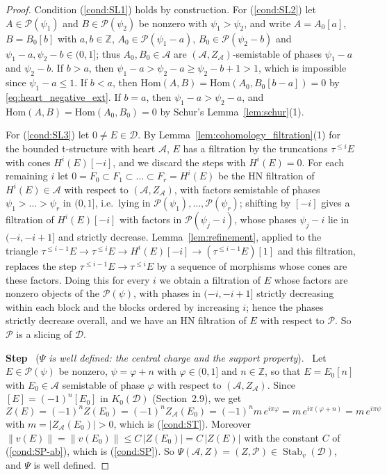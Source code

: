 \documentclass[12pt]{amsart}
\newcommand{\condref}[1]{\textup{(\ref{#1})}}
\numberwithin{theorem}{section}
\theoremstyle{definition}
\newcounter{pstep}
\newcommand{\step}[1]{\par\medskip\noindent\refstepcounter{pstep}\textbf{Step \thepstep}\ (\textit{#1}).\ \ignorespaces}
\newcommand{\ZZ}{\mathbb{Z}}
\newcommand{\calA}{\mathcal{A}}
\newcommand{\calP}{\mathcal{P}}
\newcommand{\Hom}{\mathrm{Hom}}
\newcommand{\Kgroup}{K_0}
\newcommand{\calD}{\mathcal{D}}
\begin{document}
\begin{proof}
		Condition \condref{cond:SL1} holds by construction.
		For \condref{cond:SL2} let $A \in \calP(\psi_1)$ and $B \in \calP(\psi_2)$ be nonzero with $\psi_1 > \psi_2$, and write $A = A_0[a]$, $B = B_0[b]$ with $a, b \in \ZZ$, $A_0 \in \calP(\psi_1 - a)$, $B_0 \in \calP(\psi_2 - b)$ and $\psi_1 - a, \psi_2 - b \in (0, 1]$;
		thus $A_0, B_0 \in \calA$ are $(\calA, Z_{\calA})$-semistable of phases $\psi_1 - a$ and $\psi_2 - b$.
		If $b > a$, then $\psi_1 - a > \psi_2 - a \geqslant \psi_2 - b + 1 > 1$, which is impossible since $\psi_1 - a \leqslant 1$.
		If $b < a$, then $\Hom(A, B) = \Hom(A_0, B_0[b - a]) = 0$ by \eqref{eq:heart_negative_ext}.
		If $b = a$, then $\psi_1 - a > \psi_2 - a$, and $\Hom(A, B) = \Hom(A_0, B_0) = 0$ by Schur's Lemma~\ref{lem:schur}(1).

		For \condref{cond:SL3} let $0 \neq E \in \calD$.
		By Lemma~\ref{lem:cohomology_filtration}(1) for the bounded t-structure with heart $\calA$, $E$ has a filtration by the truncations $\tau^{\leqslant i} E$ with cones $H^i(E)[-i]$, and we discard the steps with $H^i(E) = 0$.
		For each remaining $i$ let $0 = F_0 \subset F_1 \subset \ldots \subset F_r = H^i(E)$ be the HN filtration of $H^i(E) \in \calA$ with respect to $(\calA, Z_{\calA})$, with factors semistable of phases $\psi_1 > \ldots > \psi_r$ in $(0, 1]$, i.e.\ lying in $\calP(\psi_1), \ldots, \calP(\psi_r)$;
		shifting by $[-i]$ gives a filtration of $H^i(E)[-i]$ with factors in $\calP(\psi_j - i)$, whose phases $\psi_j - i$ lie in $(-i, -i + 1]$ and strictly decrease.
		Lemma~\ref{lem:refinement}, applied to the triangle $\tau^{\leqslant i - 1} E \to \tau^{\leqslant i} E \to H^i(E)[-i] \to (\tau^{\leqslant i - 1} E)[1]$ and this filtration, replaces the step $\tau^{\leqslant i - 1} E \to \tau^{\leqslant i} E$ by a sequence of morphisms whose cones are these factors.
		Doing this for every $i$ we obtain a filtration of $E$ whose factors are nonzero objects of the $\calP(\psi)$, with phases in $(-i, -i + 1]$ strictly decreasing within each block and the blocks ordered by increasing $i$;
		hence the phases strictly decrease overall, and we have an HN filtration of $E$ with respect to $\calP$.
		So $\calP$ is a slicing of $\calD$.

		\step{$\Psi$ is well defined: the central charge and the support property}
		Let $E \in \calP(\psi)$ be nonzero, $\psi = \varphi + n$ with $\varphi \in (0, 1]$ and $n \in \ZZ$, so that $E = E_0[n]$ with $E_0 \in \calA$ semistable of phase $\varphi$ with respect to $(\calA, Z_{\calA})$.
		Since $[E] = (-1)^n [E_0]$ in $\Kgroup(\calD)$ (Section~2.9), we get
		\[
		Z(E) = (-1)^n Z(E_0) = (-1)^n Z_{\calA}(E_0) = (-1)^n m \, e^{i \pi \varphi} = m \, e^{i \pi (\varphi + n)} = m \, e^{i \pi \psi}
		\]
		with $m = |Z_{\calA}(E_0)| > 0$, which is \condref{cond:ST}.
		Moreover $\| v(E) \| = \| v(E_0) \| \leqslant C \, |Z(E_0)| = C \, |Z(E)|$ with the constant $C$ of \condref{cond:SP-ab}, which is \condref{cond:SP}.
		So $\Psi(\calA, Z) = (Z, \calP) \in \operatorname{Stab}_v(\calD)$, and $\Psi$ is well defined.


\end{proof}
\end{document}
